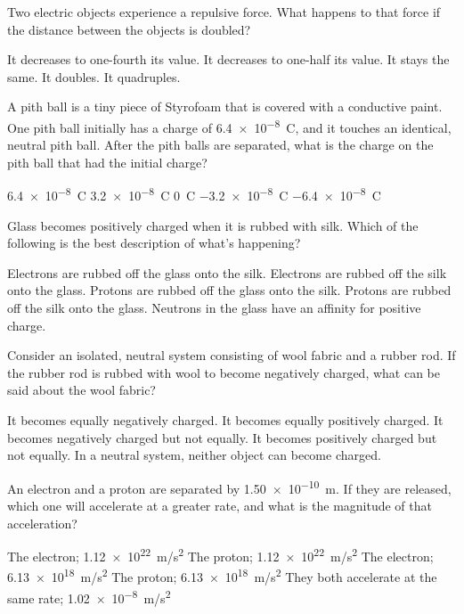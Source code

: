 \documentclass{../../../oss-ap12ibhl-print}
\begin{document}
\genheader


\begin{questions}

  \question Two electric objects experience a repulsive force. What happens
  to that force if the distance between the objects is doubled?
  \begin{choices}
    \choice It decreases to one-fourth its value.
    \choice It decreases to one-half its value.
    \choice It stays the same.
    \choice It doubles.
    \choice It quadruples.
  \end{choices}
    
  \question A pith ball is a tiny piece of Styrofoam that is covered with a
  conductive paint. One pith ball initially has a charge of
  \SI{6.4e-8}{\coulomb}, and it touches an identical, neutral pith ball. After
  the pith balls are separated, what is the charge on the pith ball that had
  the initial charge?
  \begin{choices}
    \choice\SI{6.4e-8}{\coulomb}
    \choice\SI{3.2e-8}{\coulomb}
    \choice\SI{0}{\coulomb}
    \choice\SI{-3.2e-8}{\coulomb}
    \choice\SI{-6.4e-8}{\coulomb}
  \end{choices}

  \question Glass becomes positively charged when it is rubbed with silk. Which
  of the following is the best description of what's happening?
  \begin{choices}
    \choice Electrons are rubbed off the glass onto the silk.
    \choice Electrons are rubbed off the silk onto the glass.
    \choice Protons are rubbed off the glass onto the silk.
    \choice Protons are rubbed off the silk onto the glass.
    \choice Neutrons in the glass have an affinity for positive charge.
  \end{choices}

  \question Consider an isolated, neutral system consisting of wool fabric and a
  rubber rod. If the rubber rod is rubbed with wool to become negatively
  charged, what can be said about the wool fabric?
  \begin{choices}
    \choice It becomes equally negatively charged.
    \choice It becomes equally positively charged.
    \choice It becomes negatively charged but not equally.
    \choice It becomes positively charged but not equally.
    \choice In a neutral system, neither object can become charged.
  \end{choices}

  \question An electron and a proton are separated by \SI{1.50e-10}{\metre}. If
  they are released, which one will accelerate at a greater rate, and what is
  the magnitude of that acceleration?
  \begin{choices}
    \choice The electron; \SI{1.12e22}{m/s^2}
    \choice The proton; \SI{1.12e22}{m/s^2}
    \choice The electron; \SI{6.13e18}{m/s^2}
    \choice The proton; \SI{6.13e18}{m/s^2}
    \choice They both accelerate at the same rate; \SI{1.02e-8}{m/s^2}
  \end{choices}


\end{questions}
\end{document}
